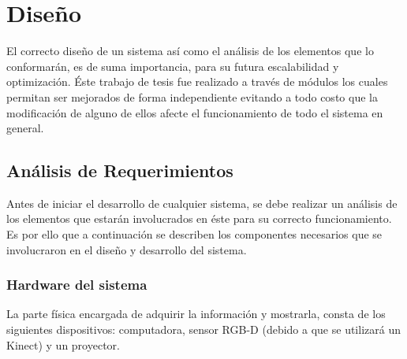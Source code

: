 \documentclass[a4paper,openright,12pt]{report}
\begin{document}

\chapter{Dise\~no}\label{cap.diseno}
El correcto diseño de un sistema así como el análisis de los elementos que lo conformarán, es de suma importancia, para su futura escalabilidad y optimización. Éste trabajo de tesis fue realizado a través de módulos los cuales permitan ser mejorados de forma independiente evitando a todo costo que la modificación de alguno de ellos afecte el funcionamiento de todo el sistema en general.\\
\section{Análisis de Requerimientos}
Antes de iniciar el desarrollo de cualquier sistema, se debe realizar un análisis de los elementos que estarán involucrados en éste para su correcto funcionamiento. Es por ello que a continuación se describen los componentes necesarios que se involucraron en el diseño y desarrollo del sistema.

\subsection{Hardware del sistema}
La parte física encargada de adquirir la información y mostrarla, consta de los siguientes dispositivos: computadora, sensor RGB-D (debido a que se utilizará un Kinect\textregistered) y un proyector.\\
\end{document}
